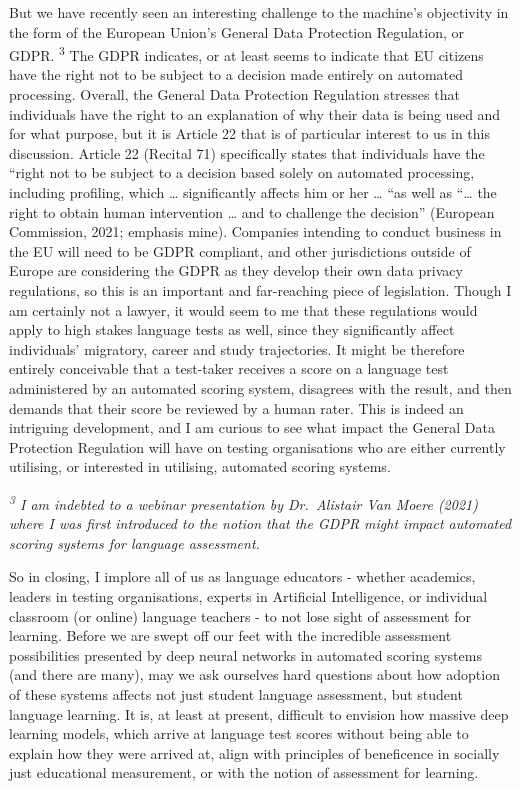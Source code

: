 \documentclass[
]{book}
\begin{document}
But we have recently seen an interesting challenge to the machine's objectivity in the form of the European Union's General Data Protection Regulation, or GDPR. \textsuperscript{3} The GDPR indicates, or at least seems to indicate that EU citizens have the right not to be subject to a decision made entirely on automated processing. Overall, the General Data Protection Regulation stresses that individuals have the right to an explanation of why their data is being used and for what purpose, but it is Article 22 that is of particular interest to us in this discussion. Article 22 (Recital 71) specifically states that individuals have the ``right not to be subject to a decision based solely on automated processing, including profiling, which \ldots{} significantly affects him or her \ldots{} ``as well as ``\ldots{} the right to obtain human intervention \ldots{} and to challenge the decision'' (European Commission, 2021; emphasis mine). Companies intending to conduct business in the EU will need to be GDPR compliant, and other jurisdictions outside of Europe are considering the GDPR as they develop their own data privacy regulations, so this is an important and far-reaching piece of legislation. Though I am certainly not a lawyer, it would seem to me that these regulations would apply to high stakes language tests as well, since they significantly affect individuals' migratory, career and study trajectories. It might be therefore entirely conceivable that a test-taker receives a score on a language test administered by an automated scoring system, disagrees with the result, and then demands that their score be reviewed by a human rater. This is indeed an intriguing development, and I am curious to see what impact the General Data Protection Regulation will have on testing organisations who are either currently utilising, or interested in utilising, automated scoring systems.

\emph{\textsuperscript{3} I am indebted to a webinar presentation by Dr.~Alistair Van Moere (2021) where I was first introduced to the notion that the GDPR might impact automated scoring systems for language assessment.}

So in closing, I implore all of us as language educators - whether academics, leaders in testing organisations, experts in Artificial Intelligence, or individual classroom (or online) language teachers - to not lose sight of assessment for learning. Before we are swept off our feet with the incredible assessment possibilities presented by deep neural networks in automated scoring systems (and there are many), may we ask ourselves hard questions about how adoption of these systems affects not just student language assessment, but student language learning. It is, at least at present, difficult to envision how massive deep learning models, which arrive at language test scores without being able to explain how they were arrived at, align with principles of beneficence in socially just educational measurement, or with the notion of assessment for learning.
\end{document}
